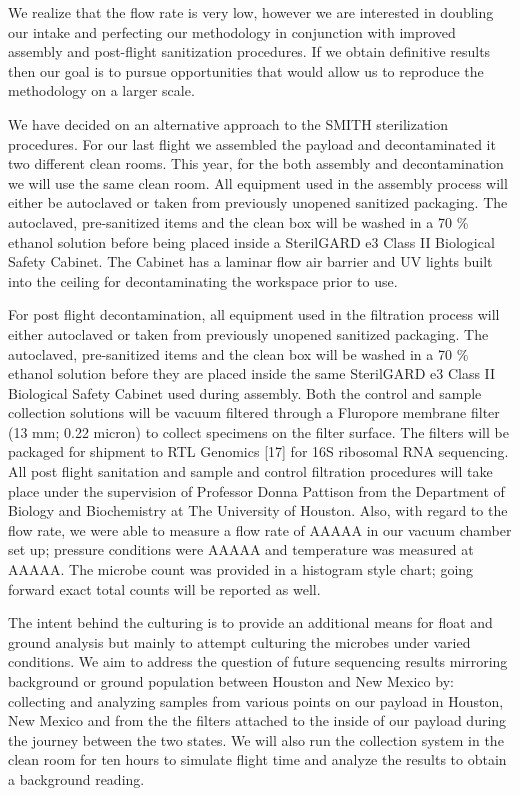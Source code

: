 We realize that the flow rate is very low, however we are interested in doubling our intake and perfecting our methodology in conjunction with improved assembly and post-flight sanitization procedures. If we obtain definitive results then our goal is to pursue opportunities that would allow us to reproduce the methodology on a larger scale.

We have decided on an alternative approach to the SMITH sterilization procedures.  For our last flight we assembled the payload and decontaminated it two different clean rooms.  This year, for the both assembly and decontamination we will use the same clean room.  All equipment used in the assembly process will either be autoclaved or taken from previously unopened sanitized packaging. The autoclaved, pre-sanitized items and the clean box will be washed in a 70 \% ethanol solution before being placed inside a SterilGARD e3 Class II Biological Safety Cabinet. The Cabinet has a laminar flow air barrier and UV lights built into the ceiling for decontaminating the workspace prior to use.

For post flight decontamination, all equipment used in the filtration process will either autoclaved or taken from previously unopened sanitized packaging. The autoclaved, pre-sanitized items and the clean box will be washed in a 70 \% ethanol solution before they are placed inside the same SterilGARD e3 Class II Biological Safety Cabinet used during assembly. Both the control and sample collection solutions will be vacuum filtered through a Fluropore membrane filter (13 mm; 0.22 micron) to collect specimens on the filter surface. The filters will be packaged for shipment to RTL Genomics [17] for 16S ribosomal RNA sequencing. All post flight sanitation and sample and control filtration procedures will take place under the supervision of Professor Donna Pattison from the Department of Biology and Biochemistry at The University of Houston.  Also, with regard to the flow rate, we were able to measure a flow rate of AAAAA in our vacuum chamber set up; pressure conditions were AAAAA and temperature was measured at AAAAA. The microbe count was provided in a histogram style chart; going forward exact total counts will be reported as well.


The intent behind the culturing is to provide an additional means for float and ground analysis but mainly to attempt culturing the microbes under varied conditions. We aim to address the question of future sequencing results mirroring background or ground population between Houston and New Mexico by: collecting and analyzing samples from various points on our payload in Houston, New Mexico and from the the filters attached to the inside of our payload during the journey between the two states. We will also run the collection system in the clean room for ten hours to simulate flight time and analyze the results to obtain a background reading.

